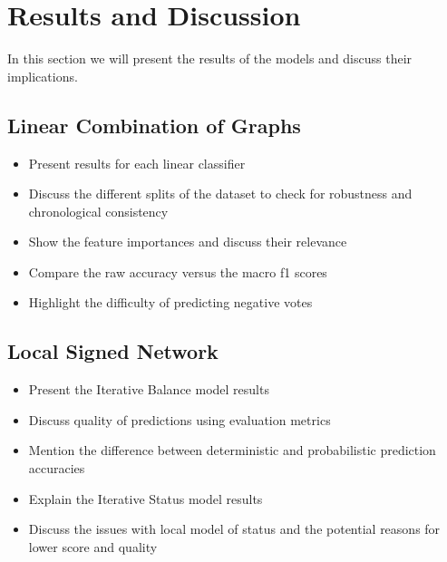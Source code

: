 \chapter{Results and Discussion} 
\label{chp:results}
In this section we will present the results of the models and discuss their implications.
\section{Linear Combination of Graphs}
\begin{itemize}
    \item Present results for each linear classifier
    \item Discuss the different splits of the dataset to check for robustness and chronological consistency
    \item Show the feature importances and discuss their relevance 
    \item Compare the raw accuracy versus the macro f1 scores
    \item Highlight the difficulty of predicting negative votes
\end{itemize}
\section{Local Signed Network}
\begin{itemize}
    \item Present the Iterative Balance model results
    \item Discuss quality of predictions using evaluation metrics
    \item Mention the difference between deterministic and probabilistic prediction accuracies
    \item Explain the Iterative Status model results 
    \item Discuss the issues with local model of status and the potential reasons for lower score and quality
\end{itemize}
